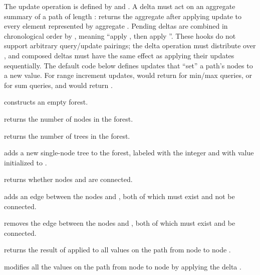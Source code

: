 The update operation is defined by  and . A delta must act on an aggregate summary of a path of length :  returns the aggregate after applying update  to every element represented by aggregate . Pending deltas are combined in chronological order by , meaning ``apply , then apply ''. These hooks do not support arbitrary query/update pairings; the delta operation must distribute over , and composed deltas must have the same effect as applying their updates sequentially. The default code below defines updates that ``set'' a path's nodes to a new value. For range increment updates,  would return  for min/max queries, or  for sum queries, and  would return .

\begin{compactitem}
  \item {} constructs an empty forest.
  \item {} returns the number of nodes in the forest.
  \item {} returns the number of trees in the forest.
  \item {} adds a new single-node tree to the forest, labeled with the integer  and with value initialized to .
  \item {} returns whether nodes  and  are connected.
  \item {} adds an edge between the nodes  and , both of which must exist and not be connected.
  \item {} removes the edge between the nodes  and , both of which must exist and be connected.
  \item {} returns the result of  applied to all values on the path from node  to node .
  \item {} modifies all the values on the path from node  to node  by applying the delta .
\end{compactitem}

